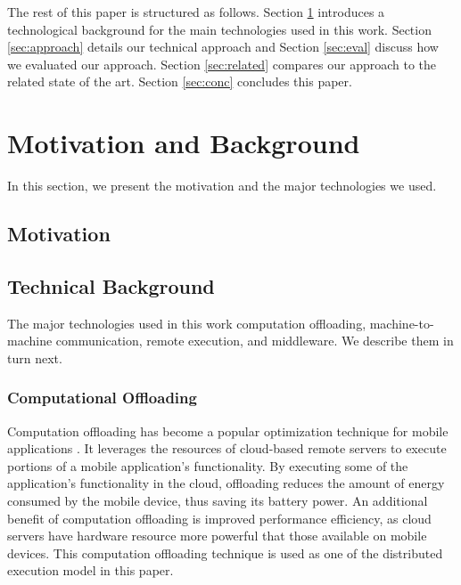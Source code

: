 \documentclass[conference]{IEEEtran}
\begin{document}

The rest of this paper is structured as follows. Section \ref{sec:background} introduces a technological background for the main technologies used in this work. Section \ref{sec:approach} details our technical approach and Section \ref{sec:eval} discuss how we evaluated our approach. Section \ref{sec:related} compares our approach to the related state of the art. Section \ref{sec:conc} concludes this paper.
 
\section{Motivation and Background}
\label{sec:background}
In this section, we present the motivation and the major technologies we used.
%
\subsection{Motivation}

\subsection{Technical Background}
The major technologies used in this work computation offloading, machine-to-machine communication, remote execution, and middleware. We describe them in turn next.

\subsubsection{Computational Offloading}   
Computation offloading has become a popular optimization technique for mobile applications \cite{cuervo+:mobisys10,chun+:eurosys11,kwon+:icdcs12,wen2012energy}. It leverages the resources of cloud-based remote servers to execute portions of a mobile application's functionality. By executing some of the application's functionality in the cloud, offloading reduces the amount of energy consumed by the mobile device, thus saving its battery power. An additional benefit of computation offloading is improved performance efficiency, as cloud servers have hardware resource more powerful that those available on mobile devices. This computation offloading technique is used as one of the distributed execution model in this paper.
\end{document}
